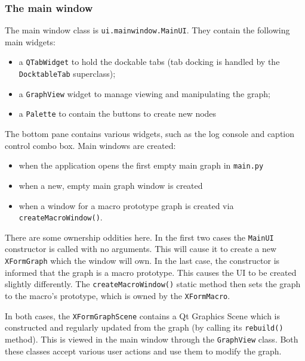 \clearpage
\subsubsection{The main window}
The main window class is \texttt{ui.mainwindow.MainUI}. They contain the
following main widgets:
\begin{itemize}
\item a \texttt{QTabWidget} to hold the dockable tabs (tab docking is
handled by the \texttt{DocktableTab} superclass);
\item a \texttt{GraphView} widget to manage viewing and manipulating
the graph;
\item a \texttt{Palette} to contain the buttons to create new nodes
\end{itemize}
The bottom pane contains various widgets, such as the log console and
caption control combo box.
Main windows are created:
\begin{itemize}
\item when the application opens the first empty main graph in \texttt{main.py}
\item when a new, empty main graph window is created
\item when a window for a macro prototype graph is created
via \texttt{createMacroWindow()}.
\end{itemize}
There are some ownership oddities here. In the first two cases
the \texttt{MainUI} constructor is called with no arguments. This will
cause it to create a new \texttt{XFormGraph} which the window will own.
In the last case, the constructor is informed that the graph is a macro
prototype. This causes the UI to be created slightly differently. 
The \texttt{createMacroWindow()} static method then sets the graph to the macro's
prototype, which is owned by the \texttt{XFormMacro}.

In both cases, the \texttt{XFormGraphScene} contains a Qt Graphics Scene
which is constructed and regularly updated from the graph (by calling
its \texttt{rebuild()} method). This is viewed in
the main window through the \texttt{GraphView} class. Both these classes
accept various user actions and use them to modify the graph.

